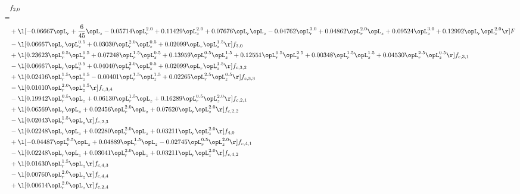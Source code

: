 \begin{alignat}{2} 
\label{eq:f_20_2} 
& f_{2,0} \nonumber \\ 
 = \\ 
& + \l[  -0.06667 \opL_r + \frac{6}{45} \opL_z   -0.05714 \opL_r^{2.0} +  0.11429 \opL_z^{2.0} +  0.07676 \opL_r \opL_z   -0.04762 \opL_r^{3.0} +  0.04862 \opL_r^{2.0} \opL_z +  0.09524 \opL_z^{3.0} +  0.12992 \opL_r \opL_z^{2.0}  \r] F \nonumber \\ 
& - \l[  0.06667 \opL_r \opL_z^{0.5} +  0.03030 \opL_r^{2.0} \opL_z^{0.5} +  0.02099 \opL_r \opL_z^{1.5}  \r] f_{3,0} \nonumber \\ 
& + \l[  0.23623 \opL_r^{0.5} \opL_z^{0.5} +  0.07248 \opL_r^{1.5} \opL_z^{0.5} +  0.13959 \opL_r^{0.5} \opL_z^{1.5} +  0.12551 \opL_r^{0.5} \opL_z^{2.5} +  0.00348 \opL_r^{1.5} \opL_z^{1.5} +  0.04530 \opL_r^{2.5} \opL_z^{0.5}  \r] f_{c,3,1} \nonumber \\ 
& - \l[  0.06667 \opL_r \opL_z^{0.5} +  0.04040 \opL_r^{2.0} \opL_z^{0.5} +  0.02099 \opL_r \opL_z^{1.5}  \r] f_{c,3,2} \nonumber \\ 
& + \l[  0.02416 \opL_r^{1.5} \opL_z^{0.5}   -0.00401 \opL_r^{1.5} \opL_z^{1.5} +  0.02265 \opL_r^{2.5} \opL_z^{0.5}  \r] f_{c,3,3} \nonumber \\ 
& - \l[  0.01010 \opL_r^{2.0} \opL_z^{0.5}  \r] f_{c,3,4} \nonumber \\ 
& - \l[  0.19942 \opL_r^{0.5} \opL_z +  0.06130 \opL_r^{1.5} \opL_z +  0.16289 \opL_r^{0.5} \opL_z^{2.0}  \r] f_{c,2,1} \nonumber \\ 
& + \l[  0.06569 \opL_r \opL_z +  0.02456 \opL_r^{2.0} \opL_z +  0.07620 \opL_r \opL_z^{2.0}  \r] f_{c,2,2} \nonumber \\ 
& - \l[  0.02043 \opL_r^{1.5} \opL_z  \r] f_{c,2,3} \nonumber \\ 
& - \l[  0.02248 \opL_r \opL_z +  0.02280 \opL_r^{2.0} \opL_z +  0.03211 \opL_r \opL_z^{2.0}  \r] f_{4,0} \nonumber \\ 
& + \l[  -0.04487 \opL_r^{0.5} \opL_z +  0.04889 \opL_r^{1.5} \opL_z   -0.02745 \opL_r^{0.5} \opL_z^{2.0}  \r] f_{c,4,1} \nonumber \\ 
& - \l[  0.02248 \opL_r \opL_z +  0.03041 \opL_r^{2.0} \opL_z +  0.03211 \opL_r \opL_z^{2.0}  \r] f_{c,4,2} \nonumber \\ 
& + \l[  0.01630 \opL_r^{1.5} \opL_z  \r] f_{c,4,3} \nonumber \\ 
& - \l[  0.00760 \opL_r^{2.0} \opL_z  \r] f_{c,4,4} \nonumber \\ 
& + \l[  0.00614 \opL_r^{2.0} \opL_z  \r] f_{c,2,4} \nonumber \\ 
\end{alignat} 


